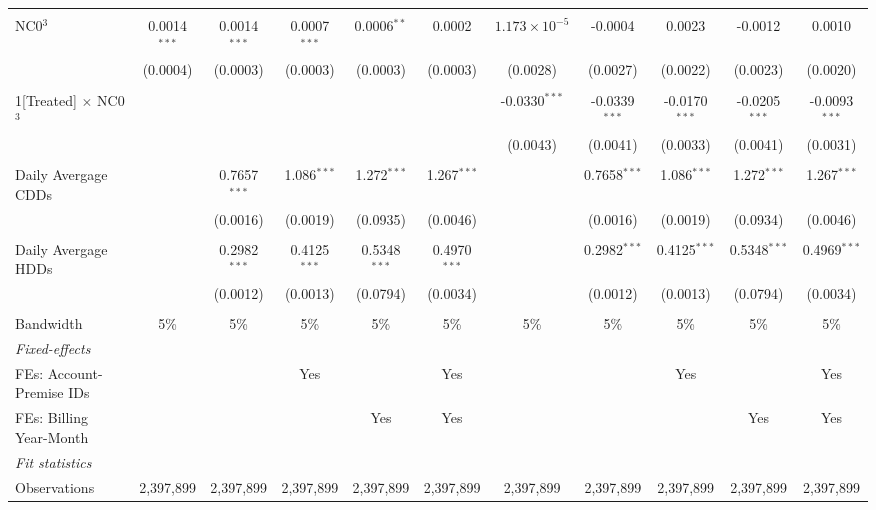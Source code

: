 \begin{table}[htbp]
\begin{adjustbox}{scale = 0.7}
\begin{tabular}{lcccccccccc}
&   &   &   &   &   &   &   &   &   &  \\
NC0$^3$&0.0014$^{***}$ & 0.0014$^{***}$ & 0.0007$^{***}$ & 0.0006$^{**}$ & 0.0002 & $1.173\times 10^{-5}$ & -0.0004 & 0.0023 & -0.0012 & 0.0010\\
  &(0.0004) & (0.0003) & (0.0003) & (0.0003) & (0.0003) & (0.0028) & (0.0027) & (0.0022) & (0.0023) & (0.0020)\\
&   &   &   &   &   &   &   &   &   &  \\
1[Treated] $\times $ NC0$^3$&   &    &    &    &    & -0.0330$^{***}$ & -0.0339$^{***}$ & -0.0170$^{***}$ & -0.0205$^{***}$ & -0.0093$^{***}$\\
  &   &    &    &    &    & (0.0043) & (0.0041) & (0.0033) & (0.0041) & (0.0031)\\
&   &   &   &   &   &   &   &   &   &  \\
Daily Avergage CDDs&   & 0.7657$^{***}$ & 1.086$^{***}$ & 1.272$^{***}$ & 1.267$^{***}$ &    & 0.7658$^{***}$ & 1.086$^{***}$ & 1.272$^{***}$ & 1.267$^{***}$\\
  &   & (0.0016) & (0.0019) & (0.0935) & (0.0046) &    & (0.0016) & (0.0019) & (0.0934) & (0.0046)\\
&   &   &   &   &   &   &   &   &   &  \\
Daily Avergage HDDs&   & 0.2982$^{***}$ & 0.4125$^{***}$ & 0.5348$^{***}$ & 0.4970$^{***}$ &    & 0.2982$^{***}$ & 0.4125$^{***}$ & 0.5348$^{***}$ & 0.4969$^{***}$\\
  &   & (0.0012) & (0.0013) & (0.0794) & (0.0034) &    & (0.0012) & (0.0013) & (0.0794) & (0.0034)\\
&   &   &   &   &   &   &   &   &   &  \\
\midrule Bandwidth & 5\% & 5\% & 5\% & 5\% & 5\% & 5\% & 5\% & 5\% & 5\% & 5\%\\
\midrule
\emph{Fixed-effects}&   &   &   &   &   &   &   &   &   &  \\
FEs: Account-Premise IDs &  &  & Yes &  & Yes &  &  & Yes &  & Yes\\
FEs: Billing Year-Month &  &  &  & Yes & Yes &  &  &  & Yes & Yes\\
\midrule
\emph{Fit statistics}&  & & & & & & & & & \\
Observations & 2,397,899&2,397,899&2,397,899&2,397,899&2,397,899&2,397,899&2,397,899&2,397,899&2,397,899&2,397,899\\

\end{tabular}
\end{adjustbox}
\end{table}
